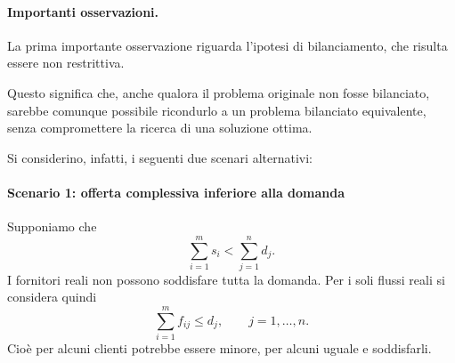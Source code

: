 \newpage

\paragraph{Importanti osservazioni.}

La prima importante osservazione riguarda l'ipotesi di bilanciamento, che risulta essere non restrittiva.

Questo significa che, anche qualora il problema originale non fosse bilanciato, sarebbe comunque possibile ricondurlo a un problema bilanciato equivalente, senza compromettere la ricerca di una soluzione ottima.

Si considerino, infatti, i seguenti due scenari alternativi:


\paragraph{Scenario 1: offerta complessiva inferiore alla domanda}
Supponiamo che
\[
\sum_{i=1}^m s_i<\sum_{j=1}^n d_j.
\]
I fornitori reali non possono soddisfare tutta la domanda.
Per i soli flussi reali si considera quindi
\[
\sum_{i=1}^m f_{ij}\leq d_j,\qquad j=1,\ldots,n.
\]
Cioè per alcuni clienti potrebbe essere minore, per alcuni uguale e soddisfarli.


